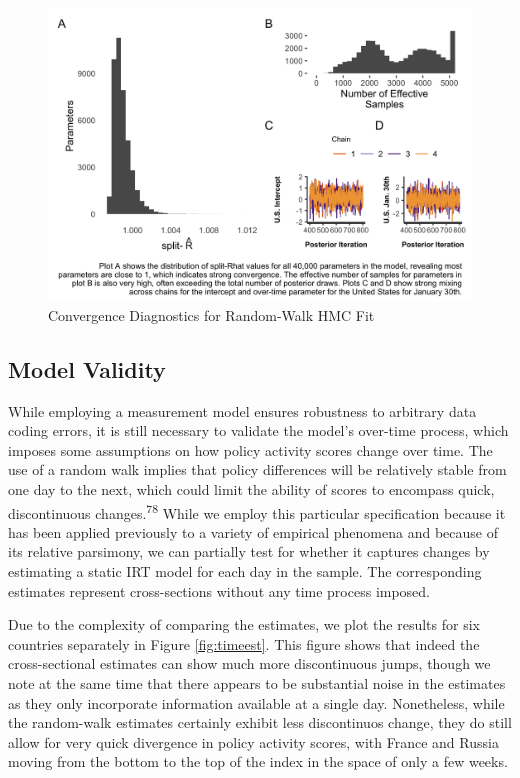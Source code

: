 \documentclass[
]{article}
\begin{document}
\begin{figure}
\includegraphics[width=6.5in]{mcmc_evaluate} \caption{Convergence Diagnostics for Random-Walk HMC Fit}\label{fig:modelconv}
\end{figure}

\hypertarget{model-validity}{%
\subsection*{Model Validity}\label{model-validity}}

While employing a measurement model ensures robustness to arbitrary data coding errors, it is still necessary to validate the model's over-time process, which imposes some assumptions on how policy activity scores change over time. The use of a random walk implies that policy differences will be relatively stable from one day to the next, which could limit the ability of scores to encompass quick, discontinuous changes.\textsuperscript{78} While we employ this particular specification because it has been applied previously to a variety of empirical phenomena and because of its relative parsimony, we can partially test for whether it captures changes by estimating a static IRT model for each day in the sample. The corresponding estimates represent cross-sections without any time process imposed.

Due to the complexity of comparing the estimates, we plot the results for six countries separately in Figure \ref{fig:timeest}. This figure shows that indeed the cross-sectional estimates can show much more discontinuous jumps, though we note at the same time that there appears to be substantial noise in the estimates as they only incorporate information available at a single day. Nonetheless, while the random-walk estimates certainly exhibit less discontinuos change, they do still allow for very quick divergence in policy activity scores, with France and Russia moving from the bottom to the top of the index in the space of only a few weeks.
\end{document}
